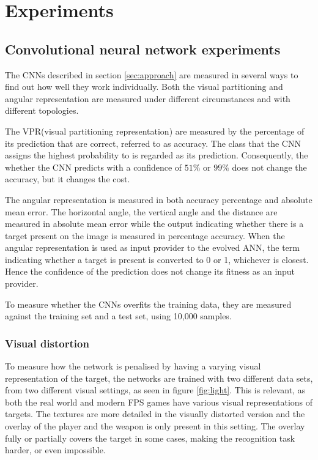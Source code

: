 \section{Experiments}
\label{sec:experiments}

\subsection{Convolutional neural network experiments}
\label{sec:cnnexperiments}
The CNNs described in section \ref{sec:approach} are measured in several ways to find out how well they work individually. Both the visual partitioning and angular representation are measured under different circumstances and with different topologies.

The VPR(visual partitioning representation) are measured by the percentage of its prediction that are correct, referred to as accuracy. The class that the CNN assigns the highest probability to is regarded as its prediction. Consequently, the whether the CNN predicts with a confidence of $51\%$ or $99\%$ does not change the accuracy, but it changes the cost.

The angular representation is measured in both accuracy percentage and absolute mean error. The horizontal angle, the vertical angle and the distance are measured in absolute mean error while the output indicating whether there is a target present on the image is measured in percentage accuracy. When the angular representation is used as input provider to the evolved ANN, the term indicating whether a target is present is converted to 0 or 1, whichever is closest. Hence the confidence of the prediction does not change its fitness as an input provider. 

To measure whether the CNNs overfits the training data, they are measured against the training set and a test set, using 10,000 samples.

\subsubsection{Visual distortion}
To measure how the network is penalised by having a varying visual representation of the target, the networks are trained with two different data sets, from two different visual settings, as seen in figure \ref{fig:light}. This is relevant, as both the real world and modern FPS games have various visual representations of targets. The textures are more detailed in the visually distorted version and the overlay of the player and the weapon is only present in this setting. The overlay fully or partially covers the target in some cases, making the recognition task harder, or even impossible.


